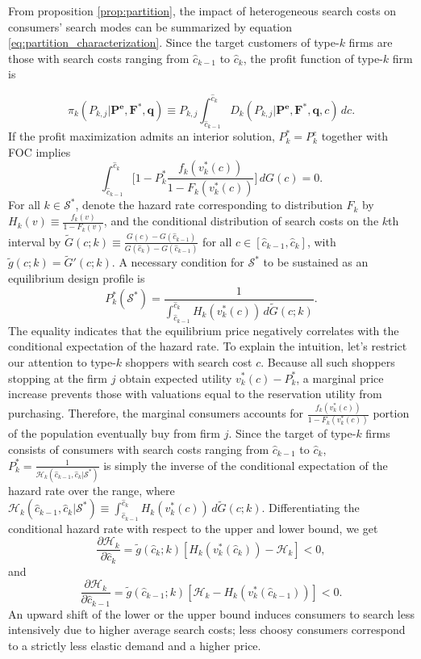 \documentclass[14pt]{article}
\theoremstyle{plain}
\theoremstyle{definition}
\theoremstyle{remark}
\DeclareRobustCommand\1{\futurelet\oneNext\oneCheck}
\renewcommand{\S}{\mathcal{S}}
\renewcommand{\H}{\mathcal{H}}
\begin{document}
From proposition \ref{prop:partition}, the impact of heterogeneous search costs on consumers' search modes can be summarized by equation \eqref{eq:partition_characterization}.  Since the target customers of type-$k$ firms are those with search costs ranging from $\hat{c}_{k-1}$ to $\hat{c}_k$, the profit function of type-$k$ firm is 

\begin{equation}\label{eq:profit_type_k}
 \pi_k(P_{k,j}|\mathbf{P^e}, \mathbf{F^*}, \mathbf{q}) \equiv  P_{k,j}  \int^{\hat{c}_{k}}_{\hat{c}_{k-1}} D_k(P_{k,j}|\mathbf{P^e}, \mathbf{F^*}, \mathbf{q},c )\,dc. 
\end{equation}
If the profit maximization admits an interior solution, $P_k^* =P_k^e$ together with FOC implies
\begin{equation}\label{eq:P_k}
\int_{\hat{c}_{k-1}}^{\hat{c}_k}\bigg[1-P_k^*\frac{f_k(v_k^*(c))}{1-F_k(v_k^*(c))}\bigg]\,dG(c)=0.
\end{equation}
 For all $k\in \S^*$, denote the hazard rate corresponding to distribution $F_k$ by $H_k(v)\equiv \frac{f_k(v)}{1-F_k(v)}$, and the conditional distribution of search costs on the $k$th interval by $\tilde{G}(c;k)\equiv \frac{G(c)-G(\hat{c}_{k-1})}{G(\hat{c}_k)-G(\hat{c}_{k-1})}$ for all $c\in[\hat{c}_{k-1}, \hat{c}_k]$, with $\tilde{g}(c;k) =\tilde{G}'(c;k)$. A necessary condition for $\S^*$ to be sustained as an equilibrium design profile is
\begin{equation} \label{eq:price_candidate}
P_k^*(\S^*) =\frac{1}{\int^{\hat{c}_{k}}_{\hat{c}_{k-1}} H_k(v_k^*(c))\,d\tilde{G}(c; k)}.    
\end{equation} 
The equality indicates that the equilibrium price negatively correlates with the conditional expectation of the hazard rate. To explain the intuition, let's restrict our attention to type-$k$ shoppers with search cost $c$. Because all such shoppers stopping at the firm $j$ obtain expected utility $v_k^*(c)-P_k^*$, a marginal price increase prevents those with valuations equal to the reservation utility from purchasing. Therefore, the marginal consumers accounts for $\frac{f_k(v_k^*(c))}{1-F_k(v_k^*(c))}$ portion of the population eventually buy from firm $j$. Since the target of type-$k$ firms consists of consumers with search costs ranging from $\hat{c}_{k-1}$ to $\hat{c}_k$, $P_k^*=\frac{1}{\H_k(\hat{c}_{k-1}, \hat{c}_k|\S^*)}$ is simply the inverse of the conditional expectation of the hazard rate over the range, where  $\mathcal{H}_k(\hat{c}_{k-1}, \hat{c}_k|\S^* )\equiv \int^{\hat{c}_k}_{\hat{c}_{k-1}} H_k(v_k^*(c))\,d\tilde{G}(c;k)$.  Differentiating the conditional hazard rate with respect to the upper and lower bound, we get 
\[
\frac{\partial \mathcal{H}_k }{\partial \hat{c}_{k}}=\tilde{g}(\hat{c}_{k};k)\left[ H_k(v_k^*(\hat{c}_k)) - \mathcal{H}_k\right]< 0,
\]
and 
\[
\frac{\partial \mathcal{H}_k }{\partial \hat{c}_{k-1}}=\tilde{g}(\hat{c}_{k-1};k)\left[ \H_k- H_k(v_k^*(\hat{c}_{k-1}))\right]< 0.
\]
An upward shift of the lower or the upper bound induces consumers to search less intensively due to higher average search costs; less choosy consumers correspond to a strictly less elastic demand and a higher price.
\end{document}
